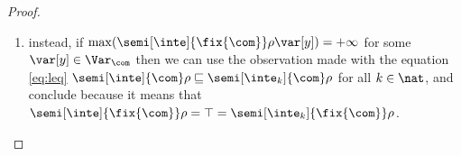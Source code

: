\begin{proof}
\begin{enumerate}[label=(\roman*)]
  \item instead, if
    \({\max(\semi[\inte]{\fix{\com}}\rho\var[y])} = +\infty\) for some
    \(\var[y]\in \Var_{\com}\) then we can use the observation made
    with the equation \eqref{eq:leq}
    \({\semi[\inte]{\com}\rho} \sqsubseteq
    {\semi[\inte_k]{\com}\rho}\) for all \({k \in \nat}\), and
    conclude because it means that
    \({\semi[\inte]{\fix{\com}}\rho} = \top =
    {\semi[\inte_k]{\fix{\com}}\rho}\).
  \end{enumerate}
\end{proof}
